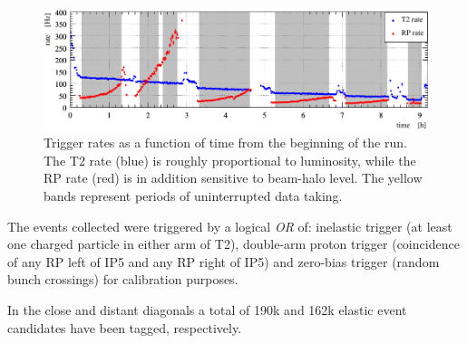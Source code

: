 \begin{figure}
\begin{center}
\includegraphics{fig/trigger_rate.pdf}
\caption{%
Trigger rates as a function of time from the beginning of the run. The T2 rate (blue) is roughly proportional to luminosity, while the RP rate (red) is in addition sensitive to beam-halo level. The yellow bands represent periods of uninterrupted data taking.
}
\label{fig:overview}
\end{center}
\end{figure}

The events collected were triggered by a logical \textit{OR} of: inelastic 
trigger (at least one charged particle in either arm of T2), double-arm proton trigger 
(coincidence of any RP left of IP5 and any RP right of IP5) and zero-bias trigger (random bunch crossings) for calibration purposes.

In the close and distant diagonals a total of 190k and 162k elastic event candidates have been tagged, respectively.

